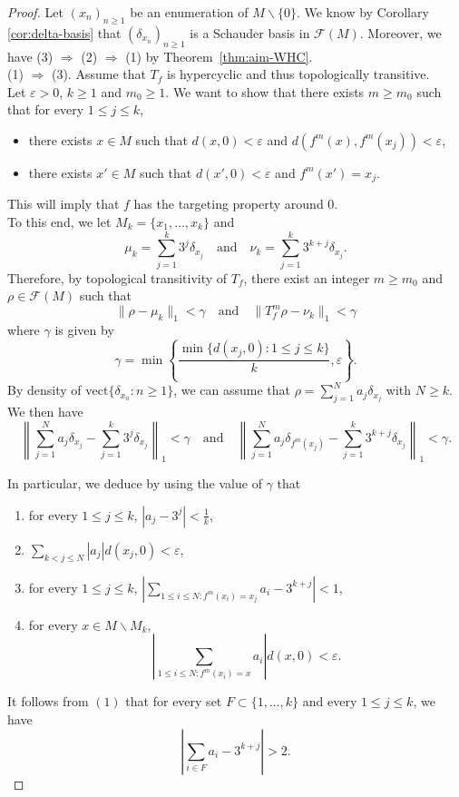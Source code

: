 \documentclass[10pt,a4paper]{amsart}
\newcommand{\free}[1]{\mathcal{F}(#1)}
\begin{document}
\begin{proof}
Let $(x_n)_{n\geq1}$ be an enumeration of $M\backslash\{0\}$. We know by Corollary \ref{cor:delta-basis} that $(\delta_{x_n})_{n\geq1}$ is a Schauder basis in $\free{M}$.
Moreover, we have (3) $\Rightarrow$ (2) $\Rightarrow$ (1) by Theorem~\ref{thm:aim-WHC}.\\


(1) $\Rightarrow$ (3). Assume that $T_f$ is hypercyclic and thus topologically transitive.\\


Let $\varepsilon>0$, $k\ge 1$ and $m_0\ge 1$. We want to show that there exists $m\ge m_0$ such that for every $1\le j\le k$, 
\begin{itemize}
\item there exists $x\in M$ such that $d(x,0)<\varepsilon$  and $d(f^m(x),f^m(x_j))<\varepsilon$,
\item there exists $x'\in M$ such that $d(x',0)<\varepsilon$ and $f^m(x')=x_j$.
\end{itemize}
This will imply that $f$ has the targeting property around $0$.\\

To this end, we let $M_k=\{x_1,\dots,x_k\}$ and
\[\mu_k=\sum_{j=1}^k 3^j\delta_{x_j} \quad \text{and}\quad \nu_k=\sum_{j=1}^k 3^{k+j}\delta_{x_j}.\]
Therefore, by topological transitivity of $T_f$, there exist an integer $m\ge m_0$ and $\rho\in \mathcal{F}(M)$ such that 
\[\|\rho-\mu_k\|_1<\gamma \quad \text{and}\quad \|T_f^m\rho-\nu_k\|_1<\gamma\]
where $\gamma$ is given by
\[\gamma=\min\left\{\frac{\min\{d(x_j,0):1\le j\le k\}}{k},\varepsilon\right\}.\]
By density of $\text{vect}\{\delta_{x_n}: n\ge 1\}$, we can assume that $\rho=\sum_{j=1}^N a_j \delta_{x_j}$ with $N\ge k$. We then have
\[\left\|\sum_{j=1}^N a_j \delta_{x_j}-\sum_{j=1}^k 3^j\delta_{x_j}\right\|_1<\gamma \quad \text{and}\quad  \left\|\sum_{j=1}^N a_j \delta_{f^m(x_j)}-\sum_{j=1}^k 3^{k+j}\delta_{x_j}\right\|_1<\gamma.\]

In particular, we deduce by using the value of $\gamma$ that
\begin{enumerate}
\item for every $1\le j\le k$, $\displaystyle |a_j-3^j|<\frac{1}{k}$,
\item  $\displaystyle \sum_{k< j\le N}|a_j|d(x_j,0)<\varepsilon$,
\item for every $1\le j\le k$, $\displaystyle\left|\sum_{1\le i\le N:f^m(x_i)=x_j}a_i-3^{k+j}\right|<1$,
\item for every $x\in M\backslash M_k$,
\[\displaystyle\left|\sum_{1\le i\le N:f^m(x_i)=x}a_i\right| d(x,0)<\varepsilon.\]
\end{enumerate}
It follows from $(1)$ that for every set $F\subset \{1,\dots,k\}$ and every $1\le j\le k$, we have
\[\left|\sum_{i\in F} a_i-3^{k+j}\right|> 2.\]


\end{proof}
\end{document}
